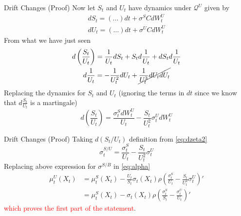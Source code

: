 \documentclass{beamer}
\begin{document}
\begin{frame}{Drift Changes (Proof)}	
Now let $S_t$ and $U_t$ have dynamics under $\mathcal{Q}^U$ given by 
\begin{equation*}
	\begin{gathered}
		dS_t = (\ldots) dt + \sigma^SCdW^U_t\\
		dU_t = (\ldots) dt + \sigma^UCdW^U_t 
	\end{gathered}
\end{equation*}
	\pause
  From what we have just seen
  \begin{equation*}
    \begin{gathered}
      d\left(\frac{S_t}{U_t}\right)=\frac{1}{U_t}dS_t+S_td\frac{1}{U_t}+dS_td\frac{1}{U_t} \\
      d\frac{1}{U_t}=-\frac{1}{U^2_t}dU_t+\cancel{\frac{1}{U^3_t}dU_tdU_t}
    \end{gathered}
  \end{equation*}
	\pause
  Replacing the dynamics for $S_t$ and $U_t$ (ignoring the terms in $dt$ since we know that $d\frac{S_t}{U_t}$ is a martingale)
  \begin{equation}
    d\left(\frac{S_t}{U_t}\right) = \frac{\sigma^S_t dW^U_t}{U_t} - \frac{S_t}{U^2_t}\sigma^U_t dW^U_t
  \end{equation}
\end{frame}

\begin{frame}{Drift Changes (Proof)}   
  Taking $d(S_t/U_t)$ definition from \cref{eq:dzeta2}
  \begin{equation}
    \sigma_t^{S/U} = \frac{\sigma^S_t}{U_t} - \frac{S_t}{U^2_t}\sigma^U_t
  \end{equation}
  Replacing above expression for $\sigma^{S/B}$ in \cref{eq:alpha}
  \begin{equation}
    \begin{aligned}
      \mu_t^U(X_t)&=\mu_t^S(X_t)-\frac{U_t}{S_t}\sigma_t(X_t)\rho\left(\frac{\sigma^S_t}{U_t} - \frac{S_t}{U^2_t}\sigma^U_t\right)'\\
      &=\mu_t^S(X_t)-\sigma_t(X_t)\rho\left(\frac{\sigma^S_t}{S_t} - \frac{\sigma^U_t}{U_t}\right)'
    \end{aligned}
  \end{equation}
  \textcolor{red}{which proves the first part of the statement}.
\end{frame}
\end{document}

